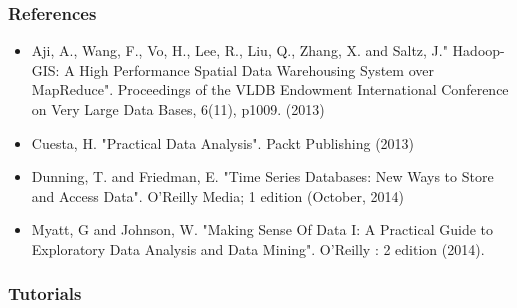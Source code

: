\documentclass[hyperref={pdfpagelabels=true}]{beamer}
\begin{document}
\begin{frame}
\frametitle{References}
\begin{itemize}
\item Aji, A., Wang, F., Vo, H., Lee, R., Liu, Q., Zhang, X. and Saltz, J." Hadoop-GIS: A High Performance Spatial Data Warehousing System over MapReduce". Proceedings of the VLDB Endowment International Conference on Very Large Data Bases, 6(11), p1009. (2013)
\item Cuesta, H. "Practical Data Analysis". Packt Publishing (2013)
\item Dunning, T. and Friedman, E. "Time Series Databases: New Ways to Store and Access Data". O'Reilly Media; 1 edition (October, 2014)
\item Myatt, G and Johnson, W. "Making Sense Of Data I: A Practical Guide to Exploratory Data Analysis and Data Mining". O'Reilly : 2 edition (2014).

\end{itemize}
\end{frame}

\begin{frame}
\frametitle{Tutorials}
\end{frame}
\end{document}

